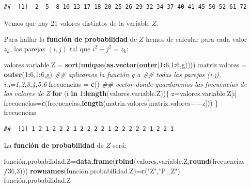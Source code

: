\documentclass[]{book}
\newenvironment{Shaded}{\begin{snugshade}}{\end{snugshade}}
\newcommand{\CommentTok}[1]{\textcolor[rgb]{0.56,0.35,0.01}{\textit{#1}}}
\newcommand{\ControlFlowTok}[1]{\textcolor[rgb]{0.13,0.29,0.53}{\textbf{#1}}}
\newcommand{\DecValTok}[1]{\textcolor[rgb]{0.00,0.00,0.81}{#1}}
\newcommand{\KeywordTok}[1]{\textcolor[rgb]{0.13,0.29,0.53}{\textbf{#1}}}
\newcommand{\NormalTok}[1]{#1}
\newcommand{\OperatorTok}[1]{\textcolor[rgb]{0.81,0.36,0.00}{\textbf{#1}}}
\newcommand{\StringTok}[1]{\textcolor[rgb]{0.31,0.60,0.02}{#1}}
\begin{document}
\begin{verbatim}
##  [1]  2  5  8 10 13 17 18 20 25 26 29 32 34 37 40 41 45 50 52 61 72
\end{verbatim}

Vemos que hay 21 valores distintos de la variable \(Z\).

Para hallar la \textbf{función de probabilidad} de \(Z\) hemos de calcular para cada valor \(z_k\), las parejas \((i,j)\) tal que \(i^2+j^2=z_k\):

\begin{Shaded}
\begin{Highlighting}[]
\NormalTok{valores.variable.Z =}\StringTok{ }\KeywordTok{sort}\NormalTok{(}\KeywordTok{unique}\NormalTok{(}\KeywordTok{as.vector}\NormalTok{(}\KeywordTok{outer}\NormalTok{(}\DecValTok{1}\OperatorTok{:}\DecValTok{6}\NormalTok{,}\DecValTok{1}\OperatorTok{:}\DecValTok{6}\NormalTok{,g))))  }
\NormalTok{matriz.valores =}\StringTok{ }\KeywordTok{outer}\NormalTok{(}\DecValTok{1}\OperatorTok{:}\DecValTok{6}\NormalTok{,}\DecValTok{1}\OperatorTok{:}\DecValTok{6}\NormalTok{,g) }\CommentTok{## aplicamos la función g a }
\CommentTok{##  todas las parejas (i,j), i,j=1,2,3,4,5,6}
\NormalTok{frecuencias =}\StringTok{ }\KeywordTok{c}\NormalTok{()  }\CommentTok{## vector donde guardaremos las frecuencias de los valores de Z}
\ControlFlowTok{for}\NormalTok{ (i }\ControlFlowTok{in} \DecValTok{1}\OperatorTok{:}\KeywordTok{length}\NormalTok{(valores.variable.Z))\{}
\NormalTok{  z=valores.variable.Z[i]}
\NormalTok{  frecuencias=}\KeywordTok{c}\NormalTok{(frecuencias,}\KeywordTok{length}\NormalTok{(matriz.valores[matriz.valores}\OperatorTok{==}\NormalTok{z]))}
\NormalTok{\}}
\NormalTok{frecuencias}
\end{Highlighting}
\end{Shaded}

\begin{verbatim}
##  [1] 1 2 1 2 2 2 1 2 2 2 2 1 2 2 2 2 2 1 2 2 1
\end{verbatim}

La \textbf{función de probabilidad} de \(Z\) será:

\begin{Shaded}
\begin{Highlighting}[]
\NormalTok{función.probabilidad.Z=}\KeywordTok{data.frame}\NormalTok{(}\KeywordTok{rbind}\NormalTok{(valores.variable.Z,}\KeywordTok{round}\NormalTok{(frecuencias}\OperatorTok{/}\DecValTok{36}\NormalTok{,}\DecValTok{3}\NormalTok{)))}
\KeywordTok{rownames}\NormalTok{(función.probabilidad.Z)=}\KeywordTok{c}\NormalTok{(}\StringTok{"Z"}\NormalTok{,}\StringTok{"P_Z"}\NormalTok{)}
\NormalTok{función.probabilidad.Z}
\end{Highlighting}
\end{Shaded}
\end{document}
